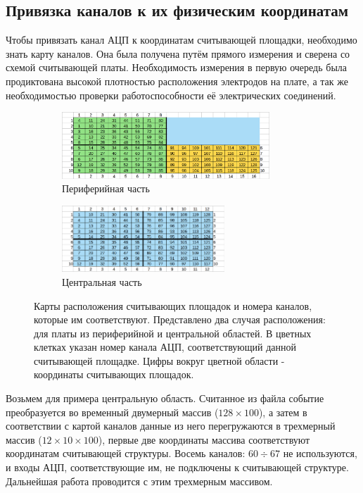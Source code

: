 \subsection{Привязка каналов к их физическим координатам}
Чтобы привязать канал АЦП к координатам считывающей площадки, необходимо знать карту каналов. Она была получена путём прямого измерения и сверена со схемой считывающей платы. Необходимость измерения в первую очередь была продиктована высокой плотностью расположения электродов на плате, а так же необходимостью проверки работоспособности её электрических соединений. 
\begin{figure}[H]
	\centering
	\begin{subfigure}{.5\textwidth}
		\centering
		\includegraphics[height = 2.5cm]{img/Side_pixmap.png}
		\caption{Периферийная часть}
	\end{subfigure}%
	\begin{subfigure}{.5\textwidth}
		\centering
		\includegraphics[height=2.5cm]{img/Center_pixmap.png}
		\caption{Центральная часть}
	\end{subfigure}
	\caption{Карты расположения считывающих площадок и номера каналов, которые им соответствуют. Представлено два случая расположения: для платы из периферийной и центральной областей. В цветных клетках указан номер канала АЦП, соответствующий данной считывающей площадке. Цифры вокруг цветной области - координаты считывающих площадок.}
	\label{fig:pixmap}
\end{figure}
Возьмем для примера центральную область. Считанное из файла событие преобразуется во временный двумерный массив ($128\times100$), а затем в соответствии с картой каналов данные из него перегружаются в трехмерный массив ($12\times10\times100$), первые две координаты массива соответствуют координатам считывающей структуры. Восемь каналов: $60\div67$ не используются, и входы АЦП, соответствующие им, не подключены к считывающей структуре. Дальнейшая работа проводится с этим трехмерным массивом.
